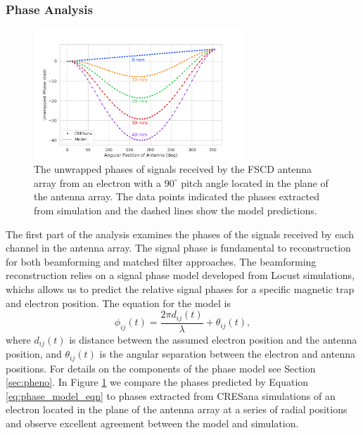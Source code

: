 \subsubsection{Phase Analysis}

\begin{figure}[htbp]
    \centering
    \includegraphics[width=0.7\textwidth]{figs/Chapter-5/230504_cresana_phases.png}
    \caption{The unwrapped phases of signals received by the FSCD antenna array from an electron with a $90^\circ$ pitch angle located in the plane of the antenna array. The data points indicated the phases extracted from simulation and the dashed lines show the model predictions. }
    \label{fig:cresana_simulated_phases}
\end{figure}

The first part of the analysis examines the phases of the signals received by each channel in the antenna array. The signal phase is fundamental to reconstruction for both beamforming and matched filter approaches. The beamforming reconstruction relies on a signal phase model developed from Locust simulations, whichs allows us to predict the relative signal phases for a specific magnetic trap and electron position. The equation for the model is
\begin{equation}
    \phi_{ij}(t) = \frac{2\pi d_{ij}(t)}{\lambda} + \theta_{ij}(t),
    \label{eq:phase_model_eqn}
\end{equation}
where $d_{ij}(t)$ is distance between the assumed electron position and the antenna position, and $\theta_{ij}(t)$ is the angular separation between the electron and antenna positions. For details on the components of the phase model see Section \ref{sec:pheno}. In Figure \ref{fig:cresana_simulated_phases} we compare the phases predicted by Equation \ref{eq:phase_model_eqn} to phases extracted from CRESana simulations of an electron located in the plane of the antenna array at a series of radial positions and observe excellent agreement between the model and simulation.


